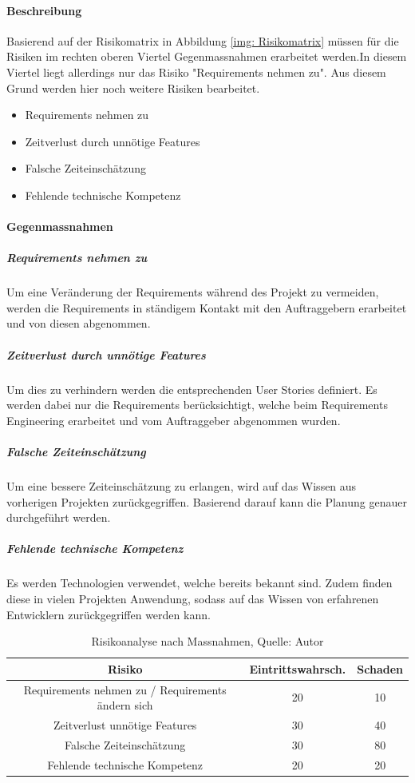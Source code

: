 \paragraph{Beschreibung}
Basierend auf der Risikomatrix in Abbildung \ref{img: Risikomatrix} müssen für die Risiken im rechten oberen Viertel Gegenmassnahmen erarbeitet werden.In diesem Viertel liegt allerdings nur das Risiko "Requirements nehmen zu". Aus diesem Grund werden hier noch weitere Risiken bearbeitet. 
\begin{itemize}
\item Requirements nehmen zu
\item Zeitverlust durch unnötige Features
\item Falsche Zeiteinschätzung
\item Fehlende technische Kompetenz
\end{itemize}

\paragraph{Gegenmassnahmen}
\subparagraph{Requirements nehmen zu}
Um eine Veränderung der Requirements während des Projekt zu vermeiden, werden die Requirements in ständigem Kontakt mit den Auftraggebern erarbeitet und von diesen abgenommen. 
\subparagraph{Zeitverlust durch unnötige Features}
Um dies zu verhindern werden die entsprechenden User Stories definiert. Es werden dabei nur die Requirements berücksichtigt, welche beim Requirements Engineering erarbeitet und vom Auftraggeber abgenommen wurden. 
 \subparagraph{Falsche Zeiteinschätzung}
Um eine bessere Zeiteinschätzung zu erlangen, wird auf das Wissen aus vorherigen Projekten zurückgegriffen. Basierend darauf kann die Planung genauer durchgeführt werden. 
 \subparagraph{Fehlende technische Kompetenz}
Es werden Technologien verwendet, welche bereits bekannt sind. Zudem finden diese in vielen Projekten Anwendung, sodass auf das Wissen von erfahrenen Entwicklern zurückgegriffen werden kann. 

\begin{table}[H]
\begin{tabularx}{\textwidth}{|C|C|C|}
\hline
\textbf{Risiko} & \textbf{Eintrittswahrsch.} & \textbf{Schaden} \\
\hline
Requirements nehmen zu / Requirements ändern sich & 20 & 10\\
\hline
Zeitverlust unnötige Features & 30 & 40\\
\hline
Falsche Zeiteinschätzung &  30 & 80\\
\hline
Fehlende technische Kompetenz & 20 & 20\\
\hline
\end{tabularx}
\caption{ \label{tbl: RisikoanalyseNachMassnahmen}Risikoanalyse nach Massnahmen, Quelle: Autor}
\end{table}

